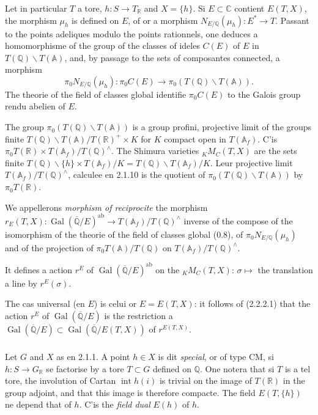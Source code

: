 \documentclass[12pt,a4paper]{article}
\theoremstyle{plain}
\theoremstyle{definition}
\theoremstyle{remark}
\DeclareMathOperator{\Gal}{Gal}
\DeclareMathOperator{\Int}{int}
\newcommand{\QQ}{\mathbb{Q}}
\newcommand{\RR}{\mathbb{R}}
\newcommand{\CC}{\mathbb{C}}
\newcommand{\Af}{\mathbb{A}_f}
\newcommand{\A}{\mathbb{A}}
\begin{document}
\subsubsection{}

Let in particular $T$ a tore, $h:S \to T_{\RR}$ and $X = \{h\}$. Si $E \subset \CC$ contient $E(T,X)$, the morphism $\mu_h$ is defined on $E$, of or a morphism $N_{E/\QQ}(\mu_h): E^* \to T$. Passant to the points adeliques modulo the points rationnels, one deduces a homomorphisme of the group of the classes of ideles $C(E)$ of $E$ in $T(\QQ)\backslash T(\A)$, and, by passage to the sets of composantes connected, a morphism
\[
\pi_0 N_{E/\QQ}(\mu_h): \pi_0 C(E) \to \pi_0(T(\QQ)\backslash T(\A)).
\]
The theorie of the field of classes global identifie $\pi_0 C(E)$ to the Galois group rendu abelien of $E$.

The group $\pi_0(T(\QQ)\backslash T(\A))$ is a group profini, projective limit of the groups finite $T(\QQ)\backslash T(\A)/T(\RR)^+ \times K$ for $K$ compact open in $T(\Af)$. C'is $\pi_0 T(\RR) \times T(\Af)/T(\QQ)^{\wedge}$. The Shimura varieties ${}_K M_C(T,X)$ are the sets finite $T(\QQ)\backslash\{h\} \times T(\Af)/K = T(\QQ)\backslash T(\Af)/K$. Leur projective limit $T(\Af)/T(\QQ)^{\wedge}$, calculee en 2.1.10 is the quotient of $\pi_0(T(\QQ)\backslash T(\A))$ by $\pi_0 T(\RR)$.

We appellerons \textit{morphism of reciprocite} the morphism $r_E(T,X): \Gal(\overline{\QQ}/E)^{\text{ab}} \to T(\Af)/T(\QQ)^{\wedge}$ inverse of the compose of the isomorphism of the theorie of the field of classes global (0.8), of $\pi_0 N_{E/\QQ}(\mu_h)$ and of the projection of $\pi_0 T(\A)/T(\QQ)$ on $T(\Af)/T(\QQ)^{\wedge}$.

It defines a action $r^E$ of $\Gal(\overline{\QQ}/E)^{\text{ab}}$ on the ${}_K M_C(T,X)$: $\sigma \mapsto$ the translation a line by $r^E(\sigma)$.

The cas universal (en $E$) is celui or $E = E(T,X)$: it follows of (2.2.2.1) that the action $r^E$ of $\Gal(\overline{\QQ}/E)$ is the restriction a $\Gal(\overline{\QQ}/E) \subset \Gal(\overline{\QQ}/E(T,X))$ of $r^{E(T,X)}$.

\subsubsection{}

Let $G$ and $X$ as en 2.1.1. A point $h \in X$ is dit \textit{special}, or of type CM, si $h:S \to G_{\RR}$ se factorise by a tore $T \subset G$ defined on $\QQ$. One notera that si $T$ is a tel tore, the involution of Cartan $\Int h(i)$ is trivial on the image of $T(\RR)$ in the group adjoint, and that this image is therefore compacte. The field $E(T,\{h\})$ ne depend that of $h$. C'is the \textit{field dual} $E(h)$ of $h$.
\end{document}
